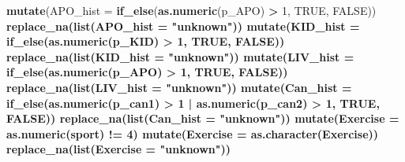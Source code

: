 \documentclass[]{article}
\newenvironment{Shaded}{\begin{snugshade}}{\end{snugshade}}
\newcommand{\CommentTok}[1]{\textcolor[rgb]{0.56,0.35,0.01}{\textit{#1}}}
\newcommand{\DataTypeTok}[1]{\textcolor[rgb]{0.13,0.29,0.53}{#1}}
\newcommand{\DecValTok}[1]{\textcolor[rgb]{0.00,0.00,0.81}{#1}}
\newcommand{\KeywordTok}[1]{\textcolor[rgb]{0.13,0.29,0.53}{\textbf{#1}}}
\newcommand{\NormalTok}[1]{#1}
\newcommand{\OperatorTok}[1]{\textcolor[rgb]{0.81,0.36,0.00}{\textbf{#1}}}
\newcommand{\OtherTok}[1]{\textcolor[rgb]{0.56,0.35,0.01}{#1}}
\newcommand{\StringTok}[1]{\textcolor[rgb]{0.31,0.60,0.02}{#1}}
\begin{document}
\begin{Shaded}
\begin{Highlighting}[]
{{{{{{{{{{{{{{{{{{\StringTok{  }\KeywordTok{mutate}\NormalTok{(}\DataTypeTok{APO_hist =} \KeywordTok{if_else}\NormalTok{(}\KeywordTok{as.numeric}\NormalTok{(p_APO) }\OperatorTok{>}\StringTok{ }\DecValTok{1}\NormalTok{, }\OtherTok{TRUE}\NormalTok{, }\OtherTok{FALSE}\NormalTok{)) }\OperatorTok{%
\StringTok{  }\KeywordTok{replace_na}\NormalTok{(}\KeywordTok{list}\NormalTok{(}\DataTypeTok{APO_hist =} \StringTok{"unknown"}\NormalTok{)) }\OperatorTok{%
\StringTok{  }\KeywordTok{mutate}\NormalTok{(}\DataTypeTok{KID_hist =} \KeywordTok{if_else}\NormalTok{(}\KeywordTok{as.numeric}\NormalTok{(p_KID) }\OperatorTok{>}\StringTok{ }\DecValTok{1}\NormalTok{, }\OtherTok{TRUE}\NormalTok{, }\OtherTok{FALSE}\NormalTok{)) }\OperatorTok{%
\StringTok{  }\KeywordTok{replace_na}\NormalTok{(}\KeywordTok{list}\NormalTok{(}\DataTypeTok{KID_hist =} \StringTok{"unknown"}\NormalTok{)) }\OperatorTok{%
\StringTok{  }\KeywordTok{mutate}\NormalTok{(}\DataTypeTok{LIV_hist =} \KeywordTok{if_else}\NormalTok{(}\KeywordTok{as.numeric}\NormalTok{(p_APO) }\OperatorTok{>}\StringTok{ }\DecValTok{1}\NormalTok{, }\OtherTok{TRUE}\NormalTok{, }\OtherTok{FALSE}\NormalTok{)) }\OperatorTok{%
\StringTok{  }\KeywordTok{replace_na}\NormalTok{(}\KeywordTok{list}\NormalTok{(}\DataTypeTok{LIV_hist =} \StringTok{"unknown"}\NormalTok{)) }\OperatorTok{%
\StringTok{  }\KeywordTok{mutate}\NormalTok{(}\DataTypeTok{Can_hist =} \KeywordTok{if_else}\NormalTok{(}\KeywordTok{as.numeric}\NormalTok{(p_can1) }\OperatorTok{>}\StringTok{ }\DecValTok{1} \OperatorTok{|}\StringTok{ }
\StringTok{                              }\KeywordTok{as.numeric}\NormalTok{(p_can2) }\OperatorTok{>}\StringTok{ }\DecValTok{1}\NormalTok{, }\OtherTok{TRUE}\NormalTok{, }\OtherTok{FALSE}\NormalTok{)) }\OperatorTok{%
\StringTok{  }\KeywordTok{replace_na}\NormalTok{(}\KeywordTok{list}\NormalTok{(}\DataTypeTok{Can_hist =} \StringTok{"unknown"}\NormalTok{)) }\OperatorTok{%
\StringTok{  }\KeywordTok{mutate}\NormalTok{(}\DataTypeTok{Exercise =} \KeywordTok{as.numeric}\NormalTok{(sport) }\OperatorTok{!=}\StringTok{ }\DecValTok{4}\NormalTok{) }\OperatorTok{%
\StringTok{  }\KeywordTok{mutate}\NormalTok{(}\DataTypeTok{Exercise =} \KeywordTok{as.character}\NormalTok{(Exercise)) }\OperatorTok{%
\StringTok{  }\KeywordTok{replace_na}\NormalTok{(}\KeywordTok{list}\NormalTok{(}\DataTypeTok{Exercise =} \StringTok{"unknown"}\NormalTok{)) }\OperatorTok{%
}}}}}}}}}}}}}}}}}}}}}}}}}}}}}
\end{Highlighting}
\end{Shaded}
\end{document}
